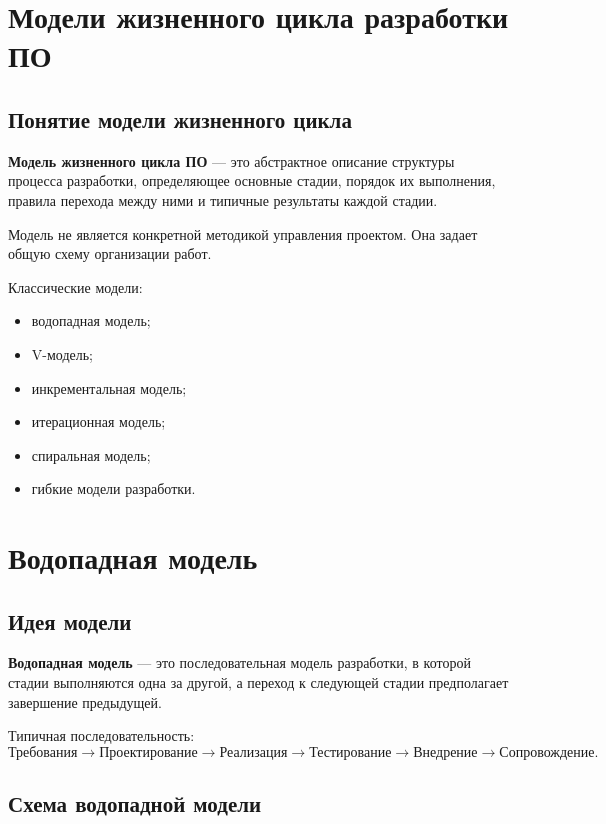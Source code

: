 \documentclass[12pt,a4paper]{article}
\begin{document}
\section{Модели жизненного цикла разработки ПО}

\subsection{Понятие модели жизненного цикла}

\textbf{Модель жизненного цикла ПО} --- это абстрактное описание структуры процесса разработки, определяющее основные стадии, порядок их выполнения, правила перехода между ними и типичные результаты каждой стадии.

Модель не является конкретной методикой управления проектом. Она задает общую схему организации работ.

Классические модели:
\begin{itemize}
    \item водопадная модель;
    \item V-модель;
    \item инкрементальная модель;
    \item итерационная модель;
    \item спиральная модель;
    \item гибкие модели разработки.
\end{itemize}

\section{Водопадная модель}

\subsection{Идея модели}

\textbf{Водопадная модель} --- это последовательная модель разработки, в которой стадии выполняются одна за другой, а переход к следующей стадии предполагает завершение предыдущей.

Типичная последовательность:
\[
\text{Требования}
\rightarrow
\text{Проектирование}
\rightarrow
\text{Реализация}
\rightarrow
\text{Тестирование}
\rightarrow
\text{Внедрение}
\rightarrow
\text{Сопровождение}.
\]

\subsection{Схема водопадной модели}
\end{document}

